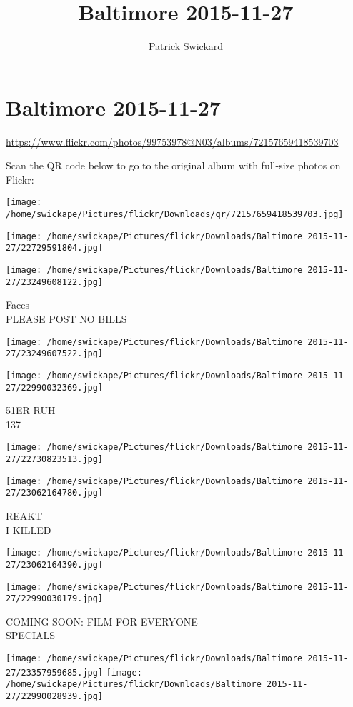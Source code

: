 \documentclass[10pt,letterpaper]{article}
\title{Baltimore 2015-11-27}
\author{Patrick Swickard}
\date{}
\begin{document}
\section*{Baltimore 2015-11-27}

\url{https://www.flickr.com/photos/99753978@N03/albums/72157659418539703}

Scan the QR code below to go to the original album with full-size photos on Flickr:

\texttt{[image: /home/swickape/Pictures/flickr/Downloads/qr/72157659418539703.jpg]}
\pagebreak

\texttt{[image: /home/swickape/Pictures/flickr/Downloads/Baltimore 2015-11-27/22729591804.jpg]}

\vspace{0.25in}
\texttt{[image: /home/swickape/Pictures/flickr/Downloads/Baltimore 2015-11-27/23249608122.jpg]}

Faces\\
PLEASE POST NO BILLS
\pagebreak

\texttt{[image: /home/swickape/Pictures/flickr/Downloads/Baltimore 2015-11-27/23249607522.jpg]}

\vspace{0.25in}
\texttt{[image: /home/swickape/Pictures/flickr/Downloads/Baltimore 2015-11-27/22990032369.jpg]}

51ER RUH\\
137
\pagebreak

\texttt{[image: /home/swickape/Pictures/flickr/Downloads/Baltimore 2015-11-27/22730823513.jpg]}

\vspace{0.25in}
\texttt{[image: /home/swickape/Pictures/flickr/Downloads/Baltimore 2015-11-27/23062164780.jpg]}

REAKT\\
I KILLED
\pagebreak

\texttt{[image: /home/swickape/Pictures/flickr/Downloads/Baltimore 2015-11-27/23062164390.jpg]}

\vspace{0.25in}
\texttt{[image: /home/swickape/Pictures/flickr/Downloads/Baltimore 2015-11-27/22990030179.jpg]}

COMING SOON: FILM FOR EVERYONE\\
SPECIALS
\pagebreak

\texttt{[image: /home/swickape/Pictures/flickr/Downloads/Baltimore 2015-11-27/23357959685.jpg]}
\texttt{[image: /home/swickape/Pictures/flickr/Downloads/Baltimore 2015-11-27/22990028939.jpg]}
\end{document}
